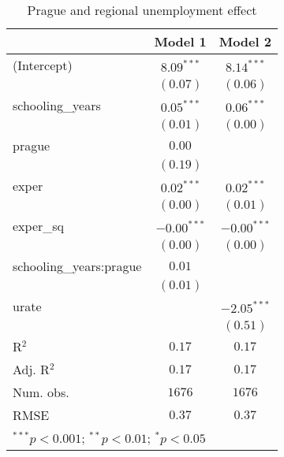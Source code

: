 
\begin{table}
\caption{Prague and regional unemployment effect}
\begin{center}
\begin{tabular}{l c c}
\hline
 & Model 1 & Model 2 \\
\hline
(Intercept)             & $8.09^{***}$  & $8.14^{***}$  \\
                        & $(0.07)$      & $(0.06)$      \\
schooling\_years        & $0.05^{***}$  & $0.06^{***}$  \\
                        & $(0.01)$      & $(0.00)$      \\
prague                  & $0.00$        &               \\
                        & $(0.19)$      &               \\
exper                   & $0.02^{***}$  & $0.02^{***}$  \\
                        & $(0.00)$      & $(0.01)$      \\
exper\_sq               & $-0.00^{***}$ & $-0.00^{***}$ \\
                        & $(0.00)$      & $(0.00)$      \\
schooling\_years:prague & $0.01$        &               \\
                        & $(0.01)$      &               \\
urate                   &               & $-2.05^{***}$ \\
                        &               & $(0.51)$      \\
\hline
R$^2$                   & $0.17$        & $0.17$        \\
Adj. R$^2$              & $0.17$        & $0.17$        \\
Num. obs.               & $1676$        & $1676$        \\
RMSE                    & $0.37$        & $0.37$        \\
\hline
\multicolumn{3}{l}{\scriptsize{$^{***}p<0.001$; $^{**}p<0.01$; $^{*}p<0.05$}}
\end{tabular}
\label{table:coefficients}
\end{center}
\end{table}

